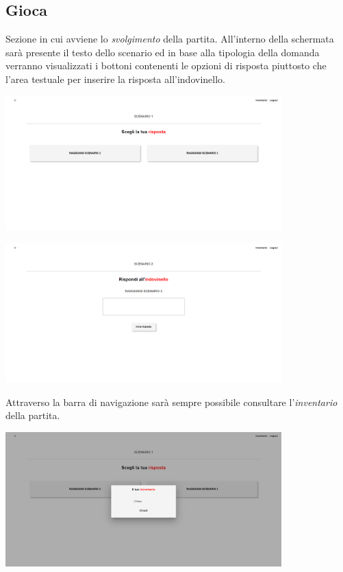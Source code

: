 \documentclass{article}
\begin{document}
\subsection*{Gioca}
Sezione in cui avviene lo \textit{svolgimento} della partita. All'interno della schermata sarà presente il testo dello scenario ed in base alla tipologia della domanda verranno visualizzati i bottoni contenenti le opzioni di risposta piuttosto che l'area testuale per inserire la risposta all'indovinello.
\begin{center}
    \includegraphics[width=0.8\textwidth]{foto23.png}
\end{center}
\begin{center}
    \includegraphics[width=0.8\textwidth]{foto24.png}
\end{center}
Attraverso la barra di navigazione sarà sempre possibile consultare l'\textit{inventario} della partita.
\begin{center}
    \includegraphics[width=0.8\textwidth]{foto25.png}
\end{center}
\end{document}
